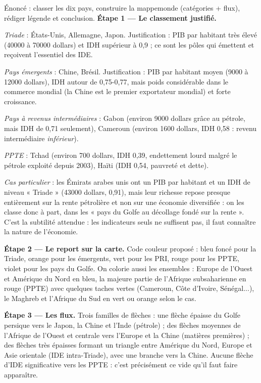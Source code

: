 \documentclass[11pt]{article}
\newcommand{\cle}[1]{{\popxbold\color{popdark}#1}}
\begin{document}
\begin{exoresolu}
Énoncé : classer les dix pays, construire la mappemonde (catégories + flux), rédiger légende et conclusion.
\tcblower
\textbf{Étape 1 — Le classement justifié.}

\emph{Triade} : États-Unis, Allemagne, Japon. Justification : PIB par habitant très élevé (\num{40000} à \num{70000} dollars) et IDH supérieur à 0,9 ; ce sont les pôles qui émettent et reçoivent l'essentiel des IDE.

\emph{Pays émergents} : Chine, Brésil. Justification : PIB par habitant moyen (\num{9000} à \num{12000} dollars), IDH autour de 0,75-0,77, mais poids considérable dans le commerce mondial (la Chine est le premier exportateur mondial) et forte croissance.

\emph{Pays à revenus intermédiaires} : Gabon (environ \num{9000} dollars grâce au pétrole, mais IDH de 0,71 seulement), Cameroun (environ \num{1600} dollars, IDH 0,58 : revenu intermédiaire \emph{inférieur}).

\emph{PPTE} : Tchad (environ \num{700} dollars, IDH 0,39, endettement lourd malgré le pétrole exploité depuis 2003), Haïti (IDH 0,54, pauvreté et dette).

\emph{Cas particulier} : les Émirats arabes unis ont un PIB par habitant et un IDH de niveau « Triade » (\num{43000} dollars, 0,91), mais leur richesse repose presque entièrement sur la \cle{rente pétrolière} et non sur une économie diversifiée : on les classe donc à part, dans les « pays du Golfe au décollage fondé sur la rente ». C'est la subtilité attendue : les indicateurs seuls ne suffisent pas, il faut connaître la nature de l'économie.

\textbf{Étape 2 — Le report sur la carte.} Code couleur proposé : bleu foncé pour la Triade, orange pour les émergents, vert pour les PRI, rouge pour les PPTE, violet pour les pays du Golfe. On colorie aussi les ensembles : Europe de l'Ouest et Amérique du Nord en bleu, la majeure partie de l'Afrique subsaharienne en rouge (PPTE) avec quelques taches vertes (Cameroun, Côte d'Ivoire, Sénégal...), le Maghreb et l'Afrique du Sud en vert ou orange selon le cas.

\textbf{Étape 3 — Les flux.} Trois familles de flèches : une flèche épaisse du Golfe persique vers le Japon, la Chine et l'Inde (pétrole) ; des flèches moyennes de l'Afrique de l'Ouest et centrale vers l'Europe et la Chine (matières premières) ; des flèches très épaisses formant un triangle entre Amérique du Nord, Europe et Asie orientale (IDE intra-Triade), avec une branche vers la Chine. Aucune flèche d'IDE significative vers les PPTE : c'est précisément ce vide qu'il faut faire apparaître.


\end{exoresolu}
\end{document}
